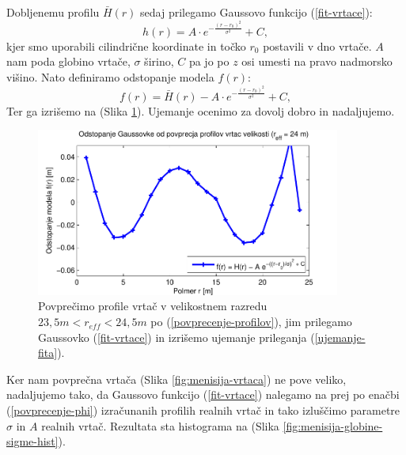 \documentclass[a4paper, twoside, 12pt]{book}
\begin{document}
Dobljenemu profilu $\bar H(r)$ sedaj prilegamo Gaussovo funkcijo (\ref{fit-vrtace}):
\begin{equation}
  h(r) = A \cdot e^{-\frac{(r-r_0)^2}{\sigma^2}} + C,
  \label{fit-vrtace}
\end{equation}
kjer smo uporabili cilindrične koordinate in točko $r_0$ postavili v dno vrtače. $A$ nam poda globino vrtače, $\sigma$ širino, $C$ pa jo po $z$ osi umesti na pravo nadmorsko višino. Nato definiramo odstopanje modela $f(r)$:
\begin{equation}
  f(r) = \bar{H}(r) - A \cdot e^{-\frac{(r-r_0)^2}{\sigma^2}} + C,
  \label{ujemanje-fita}
\end{equation}
Ter ga izrišemo na (Slika \ref{fig:menisija-profil-21-fit}). Ujemanje ocenimo za dovolj dobro in nadaljujemo.

  \begin{figure}[h!]
    \begin{center}
      \includegraphics[width=10cm]{slike/menisija-profil-21-fit}
    \end{center}
    \caption{Povprečimo profile vrtač v velikostnem razredu $23,5m < r_{eff} < 24,5m$ po (\ref{povprecenje-profilov}), jim prilegamo Gaussovko (\ref{fit-vrtace}) in izrišemo ujemanje prileganja (\ref{ujemanje-fita}).}
    \label{fig:menisija-profil-21-fit}
  \end{figure}

Ker nam povprečna vrtača (Slika \ref{fig:menisija-vrtaca}) ne pove veliko, nadaljujemo tako, da Gaussovo funkcijo (\ref{fit-vrtace}) nalegamo na prej po enačbi (\ref{povprecenje-phi}) izračunanih profilih realnih vrtač in tako izluščimo parametre $\sigma$ in $A$ realnih vrtač.
Rezultata sta histograma na (Slika \ref{fig:menisija-globine-sigme-hist}).
\end{document}
